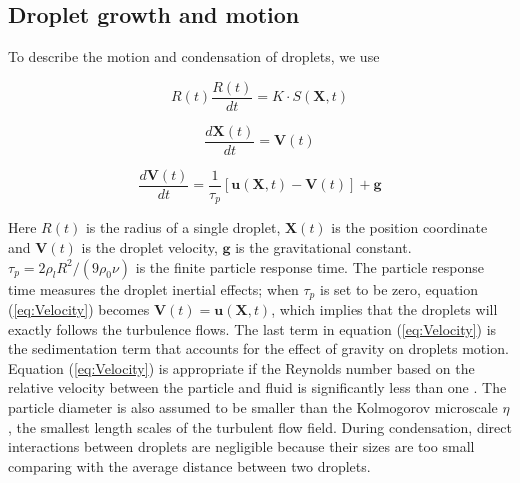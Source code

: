 \documentclass[draft,jgrga]{AGUTeX}
\begin{document}
\begin{article}
\subsection{Droplet growth and motion}

To describe the motion and condensation of droplets, we use

\begin{equation}
R(t)\frac{R(t)}{dt}=K\cdot S(\mathbf{X},t)\label{eq:Radius}
\end{equation}


\begin{equation}
\frac{d\mathbf{X}(t)}{dt}=\mathbf{V}(t)\label{eq:Coords}
\end{equation}


\begin{equation}
\frac{d\mathbf{V}(t)}{dt}=\frac{1}{\tau_{p}}[\mathbf{u}(\mathbf{X},t)-\mathbf{V}(t)]+\mathbf{g}\label{eq:Velocity}
\end{equation}


Here $R(t)$ is the radius of a single droplet, $\mathbf{X}(t)$ is the position
coordinate and $\mathbf{V}(t)$ is the droplet velocity, $\mathbf{g}$ is the gravitational constant. $\tau_{p}=2\rho_{l}R^{2}/(9\rho_{0}\nu)$ is the finite
particle response time. The particle response time measures the droplet
inertial effects; when $\tau_{p}$ is set to be zero, equation (\ref{eq:Velocity}) becomes $\mathbf{V}(t)=\mathbf{u}(\mathbf{X},t)$, which implies that the droplets will exactly follows the turbulence flows. The last term in equation (\ref{eq:Velocity}) is the sedimentation term that accounts for the effect of gravity on droplets motion. Equation (\ref{eq:Velocity}) is appropriate if the Reynolds number based on the relative velocity between the particle and fluid is significantly less than one \cite{Eaton94}. The particle
diameter is also assumed to be smaller than the Kolmogorov microscale
$\eta$, the smallest length scales of the turbulent flow field. During
condensation, direct interactions between droplets are negligible because
their sizes are too small comparing with the average distance between
two droplets.


\end{article}
\end{document}
